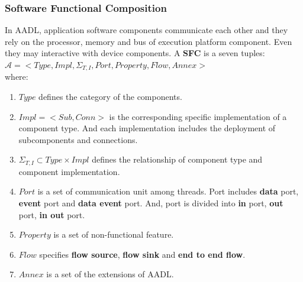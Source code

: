 \subsubsection{Software Functional Composition}
In AADL, application software components communicate each other and they rely on the processor, memory and bus of execution platform component. Even they may interactive with device components. 
\label{def:sfc} A \textbf{SFC} is a seven tuples:\\ $\mathcal{A} = <Type, Impl, \Sigma_{T, I}, Port, Property, Flow,  Annex>$ \\where:
\begin{enumerate}
\item $Type$ defines the category of the components. 
\item $Impl = <Sub, Conn>$ is the corresponding specific implementation of a component type. And each implementation includes the deployment of subcomponents and connections.
\item $\Sigma_{T, I}\subset Type\times Impl$ defines the relationship of component type and component implementation.
\item $Port$ is a set of communication unit among threads. Port includes \textbf{data} port, \textbf{event} port and \textbf{data event} port. And, port is divided into \textbf{in} port, \textbf{out} port, \textbf{in out} port.
\item $Property$ is a set of non-functional feature.
\item $Flow$ specifies \textbf{flow source}, \textbf{flow sink} and \textbf{end to end flow}. 
\item $Annex$ is a set of the extensions of AADL.
\end{enumerate} %


